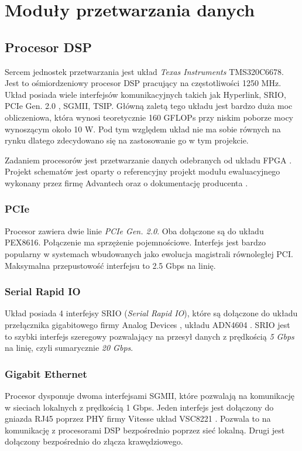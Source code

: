 \section{Moduły przetwarzania danych}
\subsection{Procesor DSP}
Sercem jednostek przetwarzania jest układ \textit{Texas Instruments} TMS320C6678. Jest to ośmiordzeniowy procesor DSP pracujący na częstotliwości 1250 MHz. Układ posiada wiele interfejsów komunikacyjnych takich jak Hyperlink, SRIO, PCIe Gen. 2.0 , SGMII, TSIP. Główną zaletą tego układu jest bardzo duża moc obliczeniowa, która wynosi teoretycznie 160 GFLOPs przy niskim poborze mocy wynoszącym około 10 W. Pod tym względem układ nie ma sobie równych na rynku dlatego zdecydowano się na zastosowanie go w tym projekcie. 

Zadaniem procesorów jest przetwarzanie danych odebranych od układu FPGA \cite{DATASHEET:TMS}. Projekt schematów jest oparty o referencyjny projekt modułu ewaluacyjnego wykonany przez firmę Advantech \cite{TMDXEVM6678L} oraz o dokumentację producenta \cite{DSP:HDG}.  

\subsubsection{PCIe}
Procesor zawiera dwie linie \textit{PCIe Gen. 2.0}. Oba dołączone są do układu PEX8616. Połączenie ma sprzężenie pojemnościowe. Interfejs jest bardzo popularny w systemach wbudowanych jako ewolucja magistrali  równoległej PCI. Maksymalna przepustowość interfejsu to 2.5 Gbps na linię. 

\subsubsection{Serial Rapid IO}
Układ posiada 4 interfejsy SRIO (\textit{Serial Rapid IO}), które są dołączone do układu przełącznika gigabitowego  firmy Analog Devices \cite{COMPANY:ANALOG}, układu ADN4604 \cite{ADN4604}. SRIO jest to szybki interfejs szeregowy pozwalający na przesył danych z prędkością \textit{5 Gbps} na linię, czyli sumarycznie \textit{20 Gbps}. 

\subsubsection{Gigabit Ethernet}
Procesor dysponuje dwoma interfejsami SGMII, które pozwalają na komunikację w sieciach lokalnych z prędkością 1 Gbps. Jeden interfejs jest dołączony do gniazda RJ45 poprzez PHY firmy Vitesse \cite{COMPANY:VITESSE} układ VSC8221 \cite{VSC8221}. Pozwala to na komunikację  z procesorami DSP bezpośrednio poprzez sieć lokalną. Drugi jest dołączony bezpośrednio do złącza krawędziowego.
